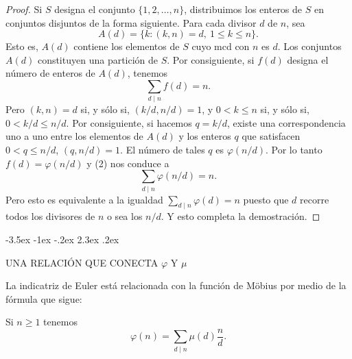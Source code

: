 \documentclass[12pt,a4paper]{book}
\makeatletter
\renewcommand\section{\@startsection{section}{1}{\z@}%
  {-3.5ex \@plus -1ex \@minus -.2ex}%
  {2.3ex \@plus .2ex}%
  {\normalfont\Large\bfseries\raggedright}}
\makeatother
\begin{document}
    \begin{proof}
        Si $S$ designa el conjunto $\{1,2,\dots,n\}$, distribuimos los enteros de $S$ en
        conjuntos disjuntos de la forma siguiente. Para cada divisor $d$ de $n$, sea
        \begin{equation*}
            A(d)=\{k:(k,n)=d,\ 1\leq k\leq n\}.
        \end{equation*}
        Esto es, $A(d)$ contiene los elementos de $S$ cuyo mcd con $n$ es $d$. Los conjuntos
        $A(d)$ constituyen una partición de $S$. Por consiguiente, si $f(d)$ designa el
        número de enteros de $A(d)$, tenemos
        \begin{equation}
            \sum_{d\mid n}f(d)=n.
        \end{equation}
        Pero $(k,n)=d$ si, y sólo si, $(k/d,n/d)=1$, y $0<k\leq n$ si, y sólo si,
        $0<k/d\leq n/d$. Por consiguiente, si hacemos $q=k/d$, existe una correspondencia
        uno a uno entre los elementos de $A(d)$ y los enteros $q$ que satisfacen
        $0<q\leq n/d$, $(q,n/d)=1$. El número de tales $q$ es $\varphi(n/d)$. Por lo tanto
        $f(d)=\varphi(n/d)$ y (2) nos conduce a
        \begin{equation*}
            \sum_{d\mid n}\varphi(n/d)=n.
        \end{equation*}
        Pero esto es equivalente a la igualdad $\sum_{d\mid n}\varphi(d)=n$ puesto que $d$
        recorre todos los divisores de $n$ o sea los $n/d$. Y esto completa la demostración.
    \end{proof}

    \section{UNA RELACIÓN QUE CONECTA \texorpdfstring{$\varphi$}{φ} Y \texorpdfstring{$\mu$}{μ}}

    La indicatriz de Euler está relacionada con la función de Möbius por medio de la
    fórmula que sigue:

    \begin{teorema}
        Si $n\geq1$ tenemos
        \begin{equation*}
            \varphi(n)=\sum_{d\mid n}\mu(d)\frac{n}{d}.
        \end{equation*}
    \end{teorema}
\end{document}
